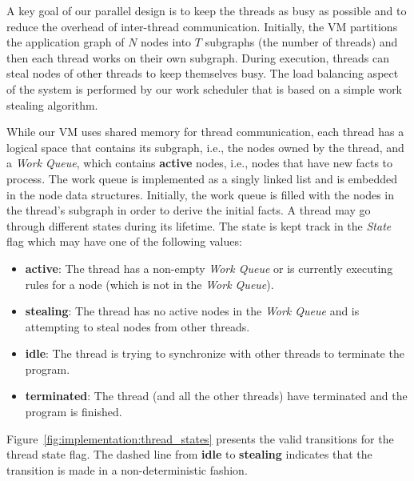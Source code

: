 A key goal of our parallel design is to keep the threads as busy as possible and
to reduce the overhead of inter-thread communication. Initially, the VM
partitions the application graph of $N$ nodes into $T$ subgraphs (the number of
threads) and then each thread works on their own subgraph. During execution,
threads can steal nodes of other threads to keep themselves busy. The load
balancing aspect of the system is performed by our work scheduler that is based
on a simple work stealing algorithm.

While our VM uses shared memory for thread communication, each thread has a
logical space that contains its subgraph, i.e., the nodes owned by the thread,
and a \emph{Work Queue}, which contains \textbf{active} nodes, i.e., nodes that
have new facts to process. The work queue is implemented as a singly linked list and
is embedded in the node data structures. Initially, the work queue is filled
with the nodes in the thread's subgraph in order to derive the initial facts. A
thread may go through different states during its lifetime. The state is kept
track in the \emph{State} flag which may have one of the following values:

\begin{itemize}

   \item \textbf{active}: The thread has a non-empty \emph{Work Queue} or is
      currently executing rules for a node (which is not in the \emph{Work
      Queue}).

   \item \textbf{stealing}: The thread has no active nodes in the \emph{Work
      Queue} and is attempting to steal nodes from other
      threads.

   \item \textbf{idle}: The thread is trying to synchronize with other threads
      to terminate the program.
   
   \item \textbf{terminated}: The thread (and all the other threads) have
      terminated and the program is finished.

\end{itemize}

Figure~\ref{fig:implementation:thread_states} presents the valid transitions for
the thread state flag. The dashed line from \textbf{idle} to \textbf{stealing}
indicates that the transition is made in a non-deterministic fashion.

